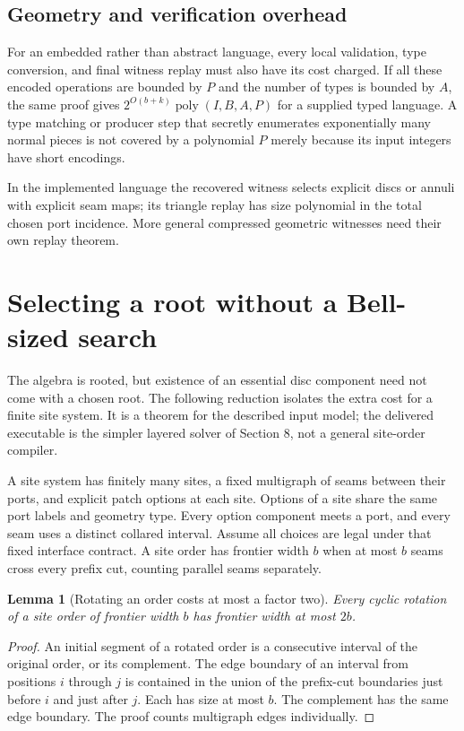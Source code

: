 \documentclass[11pt,letterpaper]{article}
\newtheorem{lemma}[theorem]{Lemma}
\theoremstyle{definition}
\newcommand{\poly}{\operatorname{poly}}
\begin{document}
\subsection{Geometry and verification overhead}
For an embedded rather than abstract language, every local validation, type conversion, and final witness replay must also have its cost charged. If all these encoded operations are bounded by $P$ and the number of types is bounded by $A$, the same proof gives $2^{O(b+k)}\poly(I,B,A,P)$ for a supplied typed language. A type matching or producer step that secretly enumerates exponentially many normal pieces is not covered by a polynomial $P$ merely because its input integers have short encodings.

In the implemented language the recovered witness selects explicit discs or annuli with explicit seam maps; its triangle replay has size polynomial in the total chosen port incidence. More general compressed geometric witnesses need their own replay theorem.

\section{Selecting a root without a Bell-sized search}\label{sec:root-selection}
The algebra is rooted, but existence of an essential disc component need not come with a chosen root. The following reduction isolates the extra cost for a finite site system. It is a theorem for the described input model; the delivered executable is the simpler layered solver of Section 8, not a general site-order compiler.

A site system has finitely many sites, a fixed multigraph of seams between their ports, and explicit patch options at each site. Options of a site share the same port labels and geometry type. Every option component meets a port, and every seam uses a distinct collared interval. Assume all choices are legal under that fixed interface contract. A site order has frontier width $b$ when at most $b$ seams cross every prefix cut, counting parallel seams separately.

\begin{lemma}[Rotating an order costs at most a factor two]\label{lem:rotate}
Every cyclic rotation of a site order of frontier width $b$ has frontier width at most $2b$.
\end{lemma}
\begin{proof}
An initial segment of a rotated order is a consecutive interval of the original order, or its complement. The edge boundary of an interval from positions $i$ through $j$ is contained in the union of the prefix-cut boundaries just before $i$ and just after $j$. Each has size at most $b$. The complement has the same edge boundary. The proof counts multigraph edges individually.
\end{proof}
\end{document}
